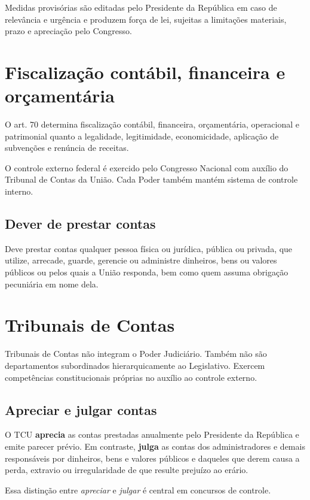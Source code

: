 Medidas provisórias são editadas pelo Presidente da República em caso de relevância e urgência e produzem força de lei, sujeitas a limitações materiais, prazo e apreciação pelo Congresso.

\section{Fiscalização contábil, financeira e orçamentária}

O art. 70 determina fiscalização contábil, financeira, orçamentária, operacional e patrimonial quanto a legalidade, legitimidade, economicidade, aplicação de subvenções e renúncia de receitas.

O controle externo federal é exercido pelo Congresso Nacional com auxílio do Tribunal de Contas da União. Cada Poder também mantém sistema de controle interno.

\subsection{Dever de prestar contas}

Deve prestar contas qualquer pessoa física ou jurídica, pública ou privada, que utilize, arrecade, guarde, gerencie ou administre dinheiros, bens ou valores públicos ou pelos quais a União responda, bem como quem assuma obrigação pecuniária em nome dela.

\section{Tribunais de Contas}

Tribunais de Contas não integram o Poder Judiciário. Também não são departamentos subordinados hierarquicamente ao Legislativo. Exercem competências constitucionais próprias no auxílio ao controle externo.

\subsection{Apreciar e julgar contas}

O TCU \textbf{aprecia} as contas prestadas anualmente pelo Presidente da República e emite parecer prévio. Em contraste, \textbf{julga} as contas dos administradores e demais responsáveis por dinheiros, bens e valores públicos e daqueles que derem causa a perda, extravio ou irregularidade de que resulte prejuízo ao erário.

Essa distinção entre \emph{apreciar} e \emph{julgar} é central em concursos de controle.

